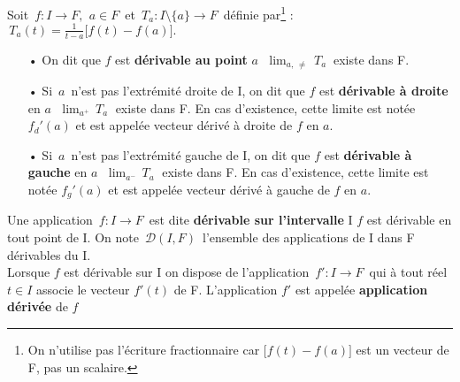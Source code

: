 \vspace{1.3cm}

\noindent Soit \(\,f:I\to F,\ \,a\in F\,\) et \(\,T_a:I\setminus\! \{a\}\to F\,\) définie par\footnote{On n'utilise pas l'écriture fractionnaire car \(\bigl[f(t)-f(a)\bigr]\) est un vecteur de F, pas un scalaire. } : \(\,\displaystyle T_a(t)=\frac{1}{t-a}\bigl[f(t)-f(a)\bigr].\)\vspace{0.1cm}
\begin{itemize}[leftmargin=1cm]
    \item[•] On dit que $f$ est \textbf{dérivable au point} $a$ \ssi \(\;\displaystyle \lim_{a,\,\neq}\,T_a\:\) existe dans F.
    
    \item[•] Si $\,a\,$ n'est pas l'extrémité droite de I, on dit que $f$ est \textbf{dérivable à droite} en $a$ \ssi \(\;\displaystyle \lim_{a^+}\,T_a\;\) existe dans F. En cas d'existence, cette limite est notée \(f_d'(a)\) et est appelée vecteur dérivé à droite de $f$ en $a$.
    
    \item[•] Si $\,a\,$ n'est pas l'extrémité gauche de I, on dit que $f$ est \textbf{dérivable à gauche} en $a$ \ssi \(\;\displaystyle \lim_{a^-}\,T_a\;\) existe dans F. En cas d'existence, cette limite est notée \(f_g'(a)\) et est appelée vecteur dérivé à gauche de $f$ en $a$.
\end{itemize}

\vspace{1cm}

Une application \(\,f:I\to F\,\) est dite \textbf{dérivable sur l'intervalle} I \ssi $f$ est dérivable en tout point de I. On note \(\,\mathcal{D}(I,F)\,\) l'ensemble des applications de I dans F dérivables du I.\\
Lorsque $f$ est dérivable sur I on dispose de l'application \(\, f':I\to F\,\) qui à tout réel \(t\in I\) associe le vecteur \(f'(t)\) de F. L'application $f'$ est appelée \textbf{application dérivée} de $f$

\vspace{1cm}

